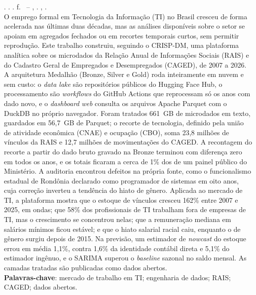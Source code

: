 
\begin{resumo}[RESUMO]
\begin{SingleSpacing}

\imprimirautorcitacao. \imprimirtitulo. \imprimirdata. \pageref{LastPage} f. \imprimirprojeto\ -- \imprimirprograma, \imprimirinstituicao. \imprimirlocal, \imprimirdata.\\

O emprego formal em Tecnologia da Informação (TI) no Brasil cresceu de forma acelerada nas últimas duas décadas, mas as análises disponíveis sobre o setor se apoiam em agregados fechados ou em recortes temporais curtos, sem permitir reprodução. Este trabalho construiu, seguindo o CRISP-DM, uma plataforma analítica sobre os microdados da Relação Anual de Informações Sociais (RAIS) e do Cadastro Geral de Empregados e Desempregados (CAGED), de 2007 a 2026. A arquitetura Medalhão (Bronze, Silver e Gold) roda inteiramente em nuvem e sem custo: o \textit{data lake} são repositórios públicos do Hugging Face Hub, o processamento são \textit{workflows} do GitHub Actions que reprocessam só os anos com dado novo, e o \textit{dashboard} \textit{web} consulta os arquivos Apache Parquet com o DuckDB no próprio navegador. Foram tratados 661~GB de microdados em texto, guardados em 56,7~GB de Parquet; o recorte de tecnologia, definido pela união de atividade econômica (CNAE) e ocupação (CBO), soma 23,8 milhões de vínculos da RAIS e 12,7 milhões de movimentações do CAGED. A recontagem do recorte a partir do dado bruto gravado na Bronze terminou com diferença zero em todos os anos, e os totais ficaram a cerca de 1\% dos de um painel público do Ministério. A auditoria encontrou defeitos na própria fonte, como o funcionalismo estadual de Rondônia declarado como programador de sistemas em oito anos, cuja correção inverteu a tendência do hiato de gênero. Aplicada ao mercado de TI, a plataforma mostra que o estoque de vínculos cresceu 162\% entre 2007 e 2025, em ondas; que 58\% dos profissionais de TI trabalham fora de empresas de TI, mas o crescimento se concentrou nelas; que a remuneração mediana em salários mínimos ficou estável; e que o hiato salarial racial caiu, enquanto o de gênero surgiu depois de 2015. Na previsão, um estimador de \textit{nowcast} do estoque errou em média 1,1\%, contra 1,6\% da identidade contábil direta e 5,1\% do estimador ingênuo, e o SARIMA superou o \textit{baseline} sazonal no saldo mensal. As camadas tratadas são publicadas como dados abertos.\\

\textbf{Palavras-chave}: mercado de trabalho em TI; engenharia de dados; RAIS; CAGED; dados abertos.

\end{SingleSpacing}
\end{resumo}
